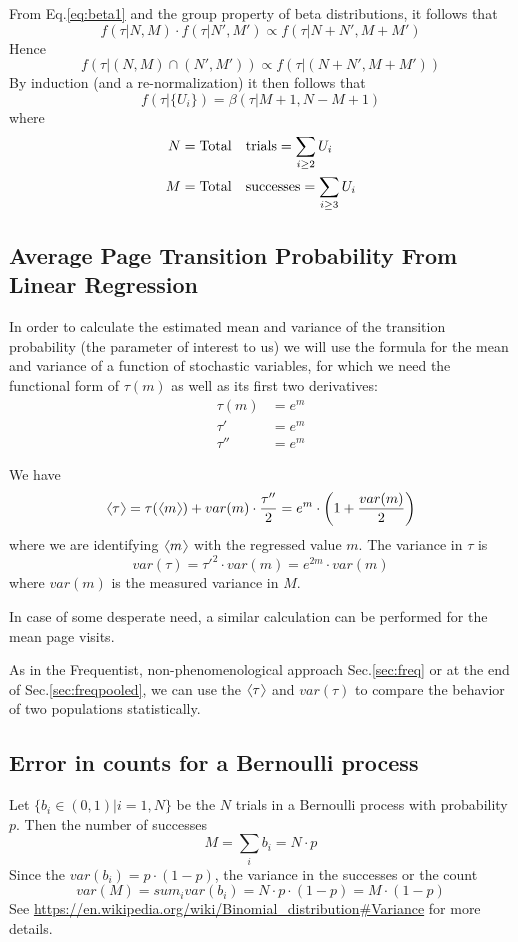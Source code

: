 \documentclass[12pt]{report}
\newcommand{\beq}{\begin{equation}} %
\newcommand{\eeq}{\end{equation}} %
\newcommand{\bdm}{\begin{displaymath}} %
\newcommand{\edm}{\end{displaymath}} %
\newcommand{\langl}{\begin{picture}(4.5,7)
\put(1.1,2.5){\rotatebox{60}{\line(1,0){5.5}}}
\put(1.1,2.5){\rotatebox{300}{\line(1,0){5.5}}}
\end{picture}}
\newcommand{\rangl}{\begin{picture}(4.5,7)
\put(.9,2.5){\rotatebox{120}{\line(1,0){5.5}}}
\put(.9,2.5){\rotatebox{240}{\line(1,0){5.5}}}
\end{picture}}
\newcommand{\mymean}[1]{\ensuremath{\langl{#1}\rangl}} %
\begin{document}
From Eq.\ref{eq:beta1} and the group property of beta distributions,
it follows that
\bdm
f(\tau|N,M)\cdot f(\tau|N',M') \propto f(\tau|N+N', M+M')
\edm
Hence
\bdm
f(\tau|(N,M)\cap (N',M'))\propto f(\tau|(N+N',M+M'))
\edm
By induction (and a re-normalization) it then follows that
\beq\label{eq:bayes_unpooled1}
f(\tau|\{U_i\}) = \beta(\tau|M+1,N-M+1)
\eeq
where
\beq
\begin{split}
  N &= {\rm Total\quad trials} = \sum_{i\ge 2}U_i\\ 
  M &= {\rm Total\quad successes} = \sum_{i\ge 3}U_i
\end{split}
\eeq

\subsection{Average Page Transition Probability From Linear Regression}\label{sec:tau_from_m}
In order to calculate the estimated mean and variance of the
transition probability (the parameter of interest to us) we will use
the formula for the mean and variance of a function of stochastic
variables, for which we need the functional form of \(\tau(m)\) as
well as its first two derivatives:
\beq
\begin{split}
  \tau(m) &= e^m \\
  \tau' &= e^m \\
  \tau'' &= e^m
\end{split}
\eeq

We have
\bdm
\mymean{\tau} = \tau(\mymean{m}) + var(m)\cdot \frac{\tau''}{2} = e^m\cdot\left(1 + \frac{var(m)}{2}\right)
\edm
where we are identifying \(\mymean{m}\) with the regressed value
\(m\). The variance in \(\tau\) is
\bdm
var(\tau) = \tau'^2\cdot var(m)= e^{2m}\cdot var(m)
\edm
where \(var(m)\) is the measured variance in \(M\).

In case of some desperate need, a similar calculation can be performed
for the mean page visits.

As in the Frequentist, non-phenomenological approach
Sec.\ref{sec:freq} or at the end of Sec.\ref{sec:freqpooled}, we can
use the \mymean{\tau} and \(var(\tau)\) to compare the behavior of two
populations statistically.

\subsection{Error in counts for a Bernoulli process}\label{sec:bernoulli}
Let \(\{b_i\in(0,1)|i=1,N\}\) be the \(N\) trials in a Bernoulli
process with probability \(p\). Then the number of successes
\bdm
M = \sum_i b_i= N\cdot p
\edm
Since the \(var(b_i)=p\cdot(1-p)\), the variance in the successes or the count
\bdm
var(M) = sum_i var(b_i) = N\cdot p\cdot(1-p) = M\cdot(1-p)
\edm
See \url{https://en.wikipedia.org/wiki/Binomial_distribution#Variance}
for more details.
\end{document}
